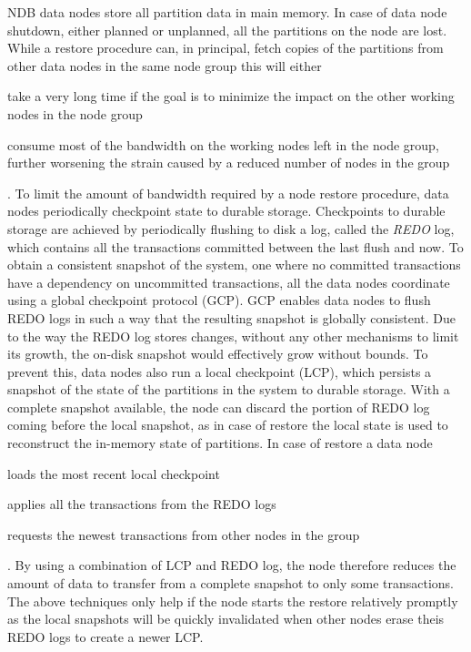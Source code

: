 NDB data nodes store all partition data in main memory.
In case of data node shutdown, either planned or unplanned, all the partitions on the node are lost.
While a restore procedure can, in principal, fetch copies of the partitions from other data nodes in the same node group this will either \begin{inparaenum}[1)]
    \item take a very long time if the goal is to minimize the impact on the other working nodes in the node group
    \item consume most of the bandwidth on the working nodes left in the node group, further worsening the strain caused by a reduced number of nodes in the group
\end{inparaenum}.
To limit the amount of bandwidth required by a node restore procedure, data nodes periodically checkpoint state to durable storage.
Checkpoints to durable storage are achieved by periodically flushing to disk a log, called the \emph{REDO} log, which contains all the transactions committed between the last flush and now.
To obtain a consistent snapshot of the system, one where no committed transactions have a dependency on uncommitted transactions, all the data nodes coordinate using a global checkpoint protocol (GCP).
GCP enables data nodes to flush REDO logs in such a way that the resulting snapshot is globally consistent.
Due to the way the REDO log stores changes, without any other mechanisms to limit its growth, the on-disk snapshot would effectively grow without bounds.
To prevent this, data nodes also run a local checkpoint (LCP), which persists a snapshot of the state of the partitions in the system to durable storage.
With a complete snapshot available, the node can discard the portion of REDO log coming before the local snapshot, as in case of restore the local state is used to reconstruct the in-memory state of partitions.
In case of restore a data node \begin{inparaenum}[i)]
    \item loads the most recent local checkpoint
    \item applies all the transactions from the REDO logs
    \item requests the newest transactions from other nodes in the group
\end{inparaenum}.
By using a combination of LCP and REDO log, the node therefore reduces the amount of data to transfer from a complete snapshot to only some transactions.
The above techniques only help if the node starts the restore relatively promptly as the local snapshots will be quickly invalidated when other nodes erase theis REDO logs to create a newer LCP.

